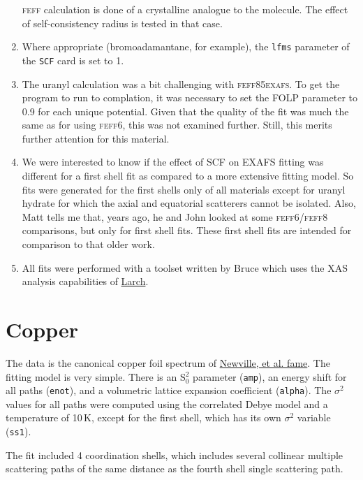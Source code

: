 \documentclass{article}
\let\stdsection\section
\renewcommand\section{\newpage\stdsection}
\begin{document}
\begin{enumerate}
  \textsc{feff} calculation is done of a crystalline analogue to the
  molecule.  The effect of self-consistency radius is tested in that
  case.
\item Where appropriate (bromoadamantane, for example), the
  \texttt{lfms} parameter of the \texttt{SCF} card is set to 1.
\item The uranyl calculation was a bit challenging with
  \textsc{feff85exafs}.  To get the program to run to complation, it
  was necessary to set the \textsc{FOLP} parameter to 0.9 for each
  unique potential.  Given that the quality of the fit was much the
  same as for using \textsc{feff}6, this was not examined further.
  Still, this merits further attention for this material.
\item We were interested to know if the effect of SCF on EXAFS fitting
  was different for a first shell fit as compared to a more extensive
  fitting model.  So fits were generated for the first shells only of
  all materials except for uranyl hydrate for which the axial and
  equatorial scatterers cannot be isolated.  Also, Matt tells me that,
  years ago, he and John looked at some \textsc{feff}6/\textsc{feff}8
  comparisons, but only for first shell fits.  These first shell fits
  are intended for comparison to that older work.
\item All fits were performed with a toolset written by Bruce which
  uses the XAS analysis capabilities of
  \href{https://github.com/xraypy/xraylarch/}{Larch}.
\end{enumerate}

\section{Copper}

\normalsize The data is the canonical copper foil spectrum of
\href{https://github.com/XraySpectroscopy/XAS-Data-Interchange/issues/29}{Newville,
  et al. fame}.  The fitting model is very simple.  There is an
S$_0^2$ parameter (\texttt{amp}), an energy shift for all paths
(\texttt{enot}), and a volumetric lattice expansion coefficient
(\texttt{alpha}).  The $\sigma^2$ values for all paths were computed
using the correlated Debye model and a temperature of 10\,K, except
for the first shell, which has its own $\sigma^2$ variable
(\texttt{ss1}).

The fit included 4 coordination shells, which includes several
collinear multiple scattering paths of the same distance as the fourth
shell single scattering path.
\end{document}
